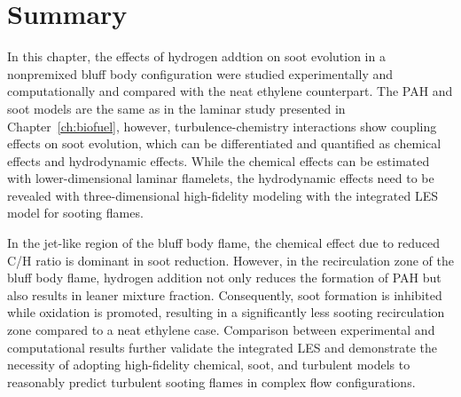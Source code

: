 \section{Summary}

In this chapter, the effects of hydrogen addtion on soot evolution in a nonpremixed bluff body configuration were studied experimentally and computationally and compared with the neat ethylene counterpart.  The PAH and soot models are the same as in the laminar study presented in Chapter~\ref{ch:biofuel}, however, turbulence-chemistry interactions show coupling effects on soot evolution, which can be differentiated and quantified as chemical effects and hydrodynamic effects.  While the chemical effects can be estimated with lower-dimensional laminar flamelets, the hydrodynamic effects need to be revealed with three-dimensional high-fidelity modeling with the integrated LES model for sooting flames.  

In the jet-like region of the bluff body flame, the chemical effect due to reduced C/H ratio is dominant in soot reduction.  However, in the recirculation zone of the bluff body flame, hydrogen addition not only reduces the formation of PAH but also results in leaner mixture fraction.  Consequently, soot formation is inhibited while oxidation is promoted, resulting in a significantly less sooting recirculation zone compared to a neat ethylene case.  Comparison between experimental and computational results further validate the integrated LES and demonstrate the necessity of adopting high-fidelity chemical, soot, and turbulent models to reasonably predict turbulent sooting flames in complex flow configurations.
